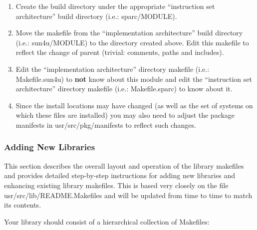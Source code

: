 \documentclass{article}
\begin{document}
\begin{enumerate}

\item Create the build directory under the appropriate ``instruction set
  architecture'' build directory (i.e.: sparc/MODULE).

\item Move the makefile from the ``implementation architecture'' build directory
  (i.e.: sun4u/MODULE) to the directory created above. Edit this makefile to
  reflect the change of parent (trivial: comments, paths and includes).

\item Edit the ``implementation architecture'' directory makefile (i.e.:
  Makefile.sun4u) to {\bf not} know about this module and edit the ``instruction set
  architecture'' directory makefile (i.e.: Makefile.sparc) to know about it.

\item Since the install locations may have changed (as well as the set of systems
  on which these files are installed) you may also need to adjust the package
  manifests in usr/src/pkg/manifests to reflect such changes.

\end{enumerate}

\subsubsection*{Adding New Libraries}

This section describes the overall layout and operation of the library makefiles
and provides detailed step-by-step instructions for adding new libraries and
enhancing existing library makefiles. This is based very closely on the file
usr/src/lib/README.Makefiles and will be updated from time to time to match its
contents.

\vspace{0.1cm}
Your library should consist of a hierarchical collection of Makefiles:
\end{document}
